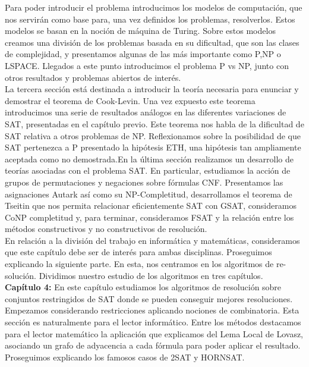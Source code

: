 Para poder introducir el problema introducimos los modelos de computación, que nos servirán como base para, una vez definidos los problemas, resolverlos. Estos modelos se basan en la noción de máquina de Turing. Sobre estos modelos creamos una división de los problemas basada en su dificultad, que son las clases de complejidad, y presentamos algunas de las más importante como P,NP o LSPACE. Llegados a este punto introducimos el problema P vs NP, junto con otros resultados y problemas abiertos de interés.\\


La tercera sección está destinada a introducir la teoría necesaria para enunciar y demostrar el teorema de Cook-Levin. Una vez expuesto este teorema introducimos una serie de resultados análogos en las diferentes variaciones de SAT, presentadas en el capítulo previo. Este teorema nos habla de la dificultad de SAT relativa a otros problemas de NP. Reflexionamos sobre la posibilidad de que SAT pertenezca a P presentado la hipótesis ETH, una hipótesis tan ampliamente aceptada como no demostrada.En la última sección realizamos un desarrollo de teorías asociadas con el problema SAT. En particular, estudiamos la acción de grupos de permutaciones y negaciones sobre fórmulas CNF. Presentamos las asignaciones Autark así como su NP-Completitud,  desarrollamos el teorema de Tseitin que nos permita relacionar eficientemente SAT con GSAT, consideramos CoNP completitud y, para terminar, consideramos FSAT y la relación entre los métodos constructivos y no constructivos de resolución.\\

En relación a la división del trabajo en informática y matemáticas, consideramos que este capítulo debe ser de interés para ambas disciplinas. Proseguimos explicando la siguiente parte. En esta, nos centramos en los algoritmos de re-solución. Dividimos nuestro estudio de los algoritmos en tres capítulos.\\


\textbf{Capítulo 4:} En este capítulo estudiamos los algoritmos de resolución sobre conjuntos restringidos de SAT donde se pueden conseguir mejores resoluciones. Empezamos considerando restricciones aplicando nociones de combinatoria. Esta sección es naturalmente para el lector informático. Entre los métodos destacamos para el lector matemático la aplicación que explicamos del Lema Local de Lovasz, asociando un grafo de adyacencia a cada fórmula para poder aplicar el resultado. Proseguimos explicando los famosos casos de 2SAT y HORNSAT. \\

